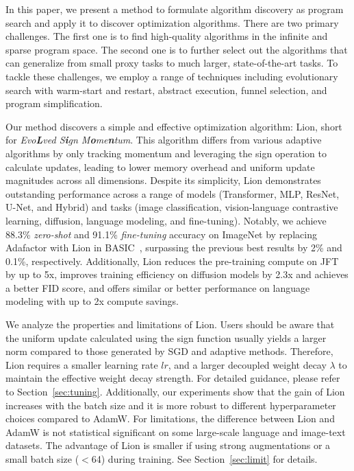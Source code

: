 \documentclass{article}
\newcommand{\name}{Lion}
\begin{document}
In this paper, we present a method to formulate algorithm discovery as program search and apply it to discover optimization algorithms. There are two primary challenges. The first one is to find high-quality algorithms in the infinite and sparse program space. The second one is to further select out the algorithms that can generalize from small proxy tasks to much larger, state-of-the-art tasks. 
To tackle these challenges, we employ a range of techniques including evolutionary search with warm-start and restart, abstract execution, funnel selection, and program simplification.



Our method discovers a simple and effective optimization algorithm: \name{}, short for \textit{Evo\textbf{L}ved S\textbf{i}gn M\textbf{o}me\textbf{n}tum}.
This algorithm differs from various adaptive algorithms by only tracking momentum and leveraging the sign operation to calculate updates, leading to lower memory overhead and uniform update magnitudes across all dimensions.
Despite its simplicity, \name{} demonstrates outstanding performance across a range of models (Transformer, MLP, ResNet, U-Net, and Hybrid) and tasks (image classification, vision-language contrastive learning, diffusion, language modeling, and fine-tuning).
Notably, we achieve 88.3\% \textit{zero-shot} and 91.1\% \textit{fine-tuning} accuracy on ImageNet by replacing Adafactor with \name{} in BASIC~\citep{hieu2021basic}, surpassing the previous best results by 2\% and 0.1\%, respectively. 
Additionally, \name{} reduces the pre-training compute on JFT by up to 5x, improves training efficiency on diffusion models by 2.3x and achieves a better FID score, and offers similar or better performance on language modeling with up to 2x compute savings.


We analyze the properties and limitations of \name{}.
Users should be aware that the uniform update calculated using the sign function usually yields a larger norm compared to those generated by SGD and adaptive methods.
Therefore, \name{} requires a smaller learning rate $lr$, and a larger decoupled weight decay $\lambda$ to maintain the effective weight decay strength. For detailed guidance, please refer to Section~\ref{sec:tuning}. Additionally, our experiments show that the gain of \name{} increases with the batch size and it is more robust to different hyperparameter choices compared to AdamW.
For limitations, the difference between \name{} and AdamW is not statistical significant on some large-scale language and image-text datasets.
The advantage of \name{} is smaller if using strong augmentations or a small batch size ($<$64) during training. 
See Section~\ref{sec:limit} for details.
\end{document}
